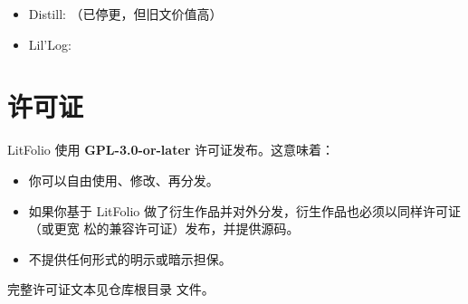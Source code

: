 \begin{itemize}
  \item Distill: （已停更，但旧文价值高）
  \item Lil'Log: 
\end{itemize}

\chapter{许可证}
\label{appx:license}

LitFolio 使用 \textbf{GPL-3.0-or-later} 许可证发布。这意味着：

\begin{itemize}
  \item 你可以自由使用、修改、再分发。
  \item 如果你基于 LitFolio 做了衍生作品并对外分发，衍生作品也必须以同样许可证（或更宽
    松的兼容许可证）发布，并提供源码。
  \item 不提供任何形式的明示或暗示担保。
\end{itemize}

完整许可证文本见仓库根目录  文件。
